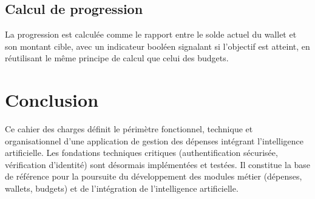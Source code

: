 \documentclass[11pt,a4paper]{article}
\begin{document}
\subsection{Calcul de progression}
La progression est calculée comme le rapport entre le solde actuel du wallet et son montant cible, avec un indicateur booléen signalant si l'objectif est atteint, en réutilisant le même principe de calcul que celui des budgets.

\section{Conclusion}
Ce cahier des charges définit le périmètre fonctionnel, technique et organisationnel d'une application de gestion des dépenses intégrant l'intelligence artificielle. Les fondations techniques critiques (authentification sécurisée, vérification d'identité) sont désormais implémentées et testées. Il constitue la base de référence pour la poursuite du développement des modules métier (dépenses, wallets, budgets) et de l'intégration de l'intelligence artificielle.
\end{document}
